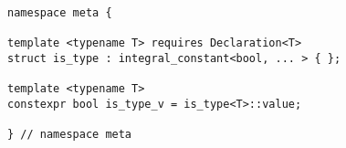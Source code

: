 
\begin{verbatim}
namespace meta {

template <typename T> requires Declaration<T>
struct is_type : integral_constant<bool, ... > { };

template <typename T>
constexpr bool is_type_v = is_type<T>::value;

} // namespace meta
\end{verbatim}
